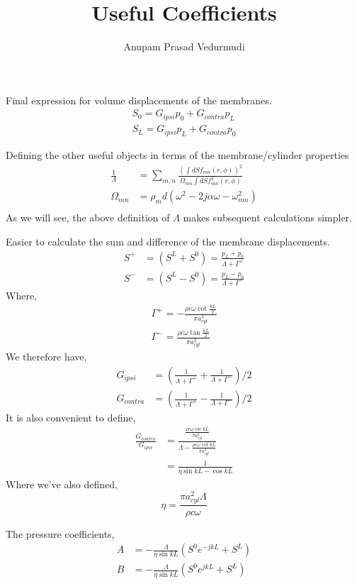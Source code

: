 \documentclass[a4paper,10pt]{article}
\title{Useful Coefficients}
\author{Anupam Prasad Vedurmudi}
\date{}
\begin{document}
\maketitle
Final expression for volume displacements of the membranes.
\begin{align}
 S_0=G_{ipsi}p_0+G_{contra}p_L\\
 S_L=G_{ipsi}p_L+G_{contra}p_0
\end{align}

Defining the other useful objects in terms of the membrane/cylinder properties
\begin{align}
 \frac{1}{\Lambda}&=\sum_{m,n}\frac{\left(\int dS f_{mn}(r,\phi)\right)^2}{\Omega_{mn}\int dS f^2_{mn}(r,\phi)}\\
 \Omega_{mn}&=\rho_m d \left(\omega^2-2j\alpha\omega-\omega^2_{mn}\right)\\
\end{align}
As we will see, the above definition of $\Lambda$ makes subsequent calculations simpler.

Easier to calculate the sum and difference of the membrane displacements.
\begin{align}
 S^+&=(S^L+S^0)=\frac{p_L+p_0}{\Lambda+\Gamma^+}\\
 S^-&=(S^L-S^0)=\frac{p_L-p_0}{\Lambda+\Gamma^-}
\end{align}
Where,
\begin{align}
 \Gamma^+=-\frac{\rho c\omega \cot \frac{kL}{2}}{\pi a^2_{cyl}}\\
 \Gamma^-=\frac{\rho c\omega \tan \frac{kL}{2}}{\pi a^2_{cyl}}
\end{align}
We therefore have,
\begin{align}
 G_{ipsi}&=\left(\frac{1}{\Lambda+\Gamma^+}+\frac{1}{\Lambda+\Gamma^-}\right)/2\\
 G_{contra}&=\left(\frac{1}{\Lambda+\Gamma^+}-\frac{1}{\Lambda+\Gamma^-}\right)/2
\end{align}
It is also convenient to define,
\begin{align}
 \frac{G_{contra}}{G_{ipsi}}&=\frac{\frac{\rho c\omega \csc kL}{\pi a^2_{cyl}}}{\Lambda-\frac{\rho c\omega \cot kL}{\pi a^2_{cyl}}}\\
			     &=\frac{1}{\eta\sin kL- \cos kL}
\end{align}
Where we've also defined,
\begin{equation}
 \eta=\frac{\pi a^2_{cyl}\Lambda}{\rho c\omega}
\end{equation}

The pressure coefficients,
\begin{align}
 A&=-\frac{\Lambda}{\eta \sin kL}\left(S^0e^{-jkL}+S^L\right)\\
 B&=-\frac{\Lambda}{\eta \sin kL}\left(S^0e^{jkL}+S^L\right)
\end{align}
\end{document}
